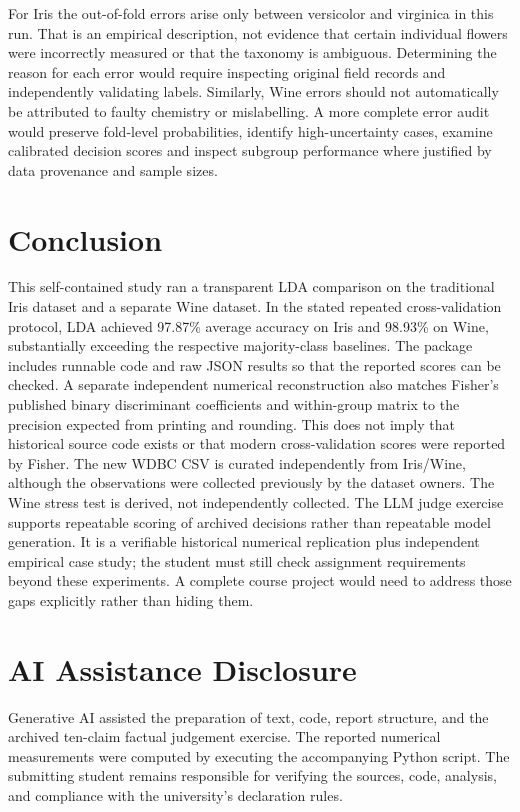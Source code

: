 \documentclass[11pt]{article}
\begin{document}
For Iris the out-of-fold errors arise only between versicolor and virginica in this run. That is an empirical description, not evidence that certain individual flowers were incorrectly measured or that the taxonomy is ambiguous. Determining the reason for each error would require inspecting original field records and independently validating labels. Similarly, Wine errors should not automatically be attributed to faulty chemistry or mislabelling. A more complete error audit would preserve fold-level probabilities, identify high-uncertainty cases, examine calibrated decision scores and inspect subgroup performance where justified by data provenance and sample sizes.

\section{Conclusion}
This self-contained study ran a transparent LDA comparison on the traditional Iris dataset and a separate Wine dataset. In the stated repeated cross-validation protocol, LDA achieved 97.87\% average accuracy on Iris and 98.93\% on Wine, substantially exceeding the respective majority-class baselines. The package includes runnable code and raw JSON results so that the reported scores can be checked. A separate independent numerical reconstruction also matches Fisher's published binary discriminant coefficients and within-group matrix to the precision expected from printing and rounding. This does not imply that historical source code exists or that modern cross-validation scores were reported by Fisher. The new WDBC CSV is curated independently from Iris/Wine, although the observations were collected previously by the dataset owners. The Wine stress test is derived, not independently collected. The LLM judge exercise supports repeatable scoring of archived decisions rather than repeatable model generation. It is a verifiable historical numerical replication plus independent empirical case study; the student must still check assignment requirements beyond these experiments. A complete course project would need to address those gaps explicitly rather than hiding them.

\section*{AI Assistance Disclosure}
Generative AI assisted the preparation of text, code, report structure, and the archived ten-claim factual judgement exercise. The reported numerical measurements were computed by executing the accompanying Python script. The submitting student remains responsible for verifying the sources, code, analysis, and compliance with the university's declaration rules.
\end{document}
